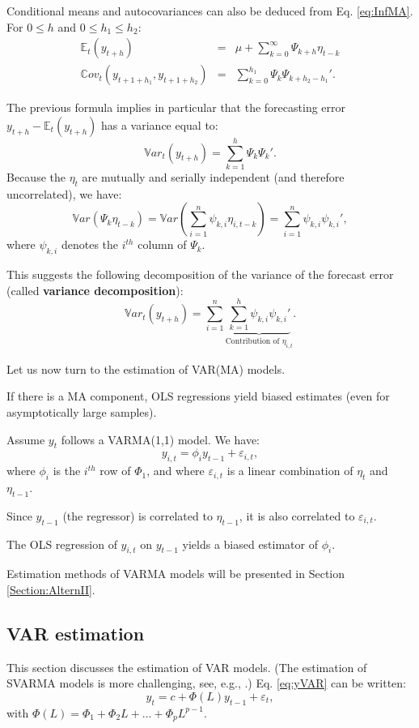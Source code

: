 \documentclass[
]{book}
\theoremstyle{definition}
\theoremstyle{definition}
\theoremstyle{definition}
\theoremstyle{definition}
\theoremstyle{remark}
\begin{document}
Conditional means and autocovariances can also be deduced from Eq. \eqref{eq:InfMA}. For \(0 \le h\) and \(0 \le h_1 \le h_2\):
\begin{eqnarray*}
\mathbb{E}_t(y_{t+h}) &=& \mu + \sum_{k=0}^\infty \Psi_{k+h} \eta_{t-k} \\
\mathbb{C}ov_t(y_{t+1+h_1},y_{t+1+h_2}) &=& \sum_{k=0}^{h_1} \Psi_{k}\Psi_{k+h_2-h_1}'.
\end{eqnarray*}

The previous formula implies in particular that the forecasting error \(y_{t+h} - \mathbb{E}_t(y_{t+h})\) has a variance equal to:
\[
\mathbb{V}ar_t(y_{t+h}) = \sum_{k=1}^{h} \Psi_{k}\Psi_{k}'.
\]
Because the \(\eta_t\) are mutually and serially independent (and therefore uncorrelated), we have:
\[
\mathbb{V}ar(\Psi_k \eta_{t-k}) = \mathbb{V}ar\left(\sum_{i=1}^n \psi_{k,i} \eta_{i,t-k}\right)  = \sum_{i=1}^n \psi_{k,i}\psi_{k,i}',
\]
where \(\psi_{k,i}\) denotes the \(i^{th}\) column of \(\Psi_k\).

This suggests the following decomposition of the variance of the forecast error (called \textbf{variance decomposition}):
\[
\mathbb{V}ar_t(y_{t+h}) = \sum_{i=1}^n \underbrace{\sum_{k=1}^{h}  \psi_{k,i}\psi_{k,i}'}_{\mbox{Contribution of $\eta_{i,t}$}}.
\]

Let us now turn to the estimation of VAR(MA) models.

If there is a MA component, OLS regressions yield biased estimates (even for asymptotically large samples).

Assume \(y_t\) follows a VARMA(1,1) model. We have:
\[
y_{i,t} = \phi_i y_{t-1} + \varepsilon_{i,t},
\]
where \(\phi_i\) is the \(i^{th}\) row of \(\Phi_1\), and where \(\varepsilon_{i,t}\) is a linear combination of \(\eta_t\) and \(\eta_{t-1}\).

Since \(y_{t-1}\) (the regressor) is correlated to \(\eta_{t-1}\), it is also correlated to \(\varepsilon_{i,t}\).

The OLS regression of \(y_{i,t}\) on \(y_{t-1}\) yields a biased estimator of \(\phi_i\).

Estimation methods of VARMA models will be presented in Section \ref{Section:AlternII}.

\hypertarget{estimVAR}{%
\subsection{VAR estimation}\label{estimVAR}}

This section discusses the estimation of VAR models. (The estimation of SVARMA models is more challenging, see, e.g., \citet{Gourieroux_Monfort_Renne_2020}.) Eq. \eqref{eq:yVAR} can be written:
\[
y_{t}=c+\Phi(L)y_{t-1}+\varepsilon_{t},
\]
with \(\Phi(L) = \Phi_1 + \Phi_2 L + \dots + \Phi_p L^{p-1}\).
\end{document}

